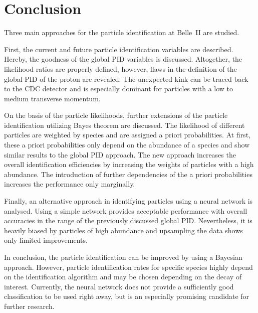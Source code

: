 \chapter{Conclusion}
\label{chap:conclusion}

Three main approaches for the particle identification at Belle~\RN{2} are studied.

First, the current and future particle identification variables are described. Hereby, the goodness of the global PID variables is discussed. Altogether, the likelihood ratios are properly defined, however, flaws in the definition of the global PID of the proton are revealed. The unexpected kink can be traced back to the CDC detector and is especially dominant for particles with a low to medium transverse momentum.

On the basis of the particle likelihoods, further extensions of the particle identification utilizing Bayes theorem are discussed. The likelihood of different particles are weighted by species and are assigned a priori probabilities. At first, these a priori probabilities only depend on the abundance of a species and show similar results to the global PID approach. The new approach increases the overall identification efficiencies by increasing the weights of particles with a high abundance. The introduction of further dependencies of the a priori probabilities increases the performance only marginally.

Finally, an alternative approach in identifying particles using a neural network is analysed. Using a simple network provides acceptable performance with overall accuracies in the range of the previously discussed global PID. Nevertheless, it is heavily biased by particles of high abundance and upsampling the data shows only limited improvements.

In conclusion, the particle identification can be improved by using a Bayesian approach. However, particle identification rates for specific species highly depend on the identification algorithm and may be chosen depending on the decay of interest. Currently, the neural network does not provide a sufficiently good classification to be used right away, but is an especially promising candidate for further research.
